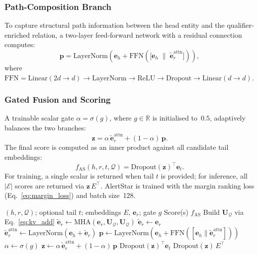 \documentclass[10pt,journal,compsoc]{IEEEtran}
\begin{document}
\subsubsection{Path-Composition Branch}
To capture structural path information between the head
entity and the qualifier-enriched relation, a two-layer
feed-forward network with a residual connection computes:
\begin{equation}
  \mathbf{p}
  = \mathrm{LayerNorm}\!\left(
      \mathbf{e}_h
      + \mathrm{FFN}\!\left(
          \bigl[\mathbf{e}_h
          \;\|\;
          \tilde{\mathbf{e}}_r^{\mathrm{attn}}\bigr]
        \right)
    \right),
  \label{eq:as_path}
\end{equation}
where
$\mathrm{FFN} = \mathrm{Linear}(2d{\to}d)
 \to \mathrm{LayerNorm}
 \to \mathrm{ReLU}
 \to \mathrm{Dropout}
 \to \mathrm{Linear}(d{\to}d)$.

\subsubsection{Gated Fusion and Scoring}
A trainable scalar gate $\alpha = \sigma(g)$,
where $g \in \mathbb{R}$ is initialised to~$0.5$,
adaptively balances the two branches:
\begin{equation}
  \mathbf{z}
  = \alpha\,\tilde{\mathbf{e}}_r^{\mathrm{attn}}
    + (1{-}\alpha)\,\mathbf{p}.
  \label{eq:as_gate}
\end{equation}
The final score is computed as an inner product against all
candidate tail embeddings:
\begin{equation}
  f_{\mathrm{AS}}(h,r,t,\mathcal{Q})
  = \mathrm{Dropout}(\mathbf{z})^{\top} \mathbf{e}_t.
  \label{eq:as_score}
\end{equation}
For training, a single scalar is returned when tail $t$ is
provided; for inference, all $|\mathcal{E}|$ scores are
returned via $\mathbf{z}\,E^{\top}$.
AlertStar is trained with the margin ranking loss
(Eq.~\ref{eq:margin_loss}) and batch size~128.

\begin{algorithm}[t]
\caption{AlertStar Forward Pass}
\label{alg:alertstar}
\begin{algorithmic}[1]
\Require $(h, r, \mathcal{Q})$; optional tail $t$;
  embeddings $E$, $\mathbf{e}_r$; gate $g$
\Ensure Score(s) $f_{\mathrm{AS}}$
  \State Build $\mathbf{U}_{\mathcal{Q}}$ via Eq.~\eqref{eq:kv_add}
  \State $\tilde{\mathbf{e}}_r \leftarrow
    \mathrm{MHA}(\mathbf{e}_r, \mathbf{U}_{\mathcal{Q}},
    \mathbf{U}_{\mathcal{Q}})$
\Else
  \State $\tilde{\mathbf{e}}_r \leftarrow \mathbf{e}_r$
\EndIf
\State $\tilde{\mathbf{e}}_r^{\mathrm{attn}} \leftarrow
  \mathrm{LayerNorm}(\mathbf{e}_h + \tilde{\mathbf{e}}_r)$
\State $\mathbf{p} \leftarrow
  \mathrm{LayerNorm}(\mathbf{e}_h +
  \mathrm{FFN}([\mathbf{e}_h \|
  \tilde{\mathbf{e}}_r^{\mathrm{attn}}]))$
\State $\alpha \leftarrow \sigma(g)$
\State $\mathbf{z} \leftarrow
  \alpha\,\tilde{\mathbf{e}}_r^{\mathrm{attn}}
  + (1{-}\alpha)\,\mathbf{p}$
  \State \Return $\mathrm{Dropout}(\mathbf{z})^{\top} \mathbf{e}_t$
\Else
  \State \Return $\mathrm{Dropout}(\mathbf{z})\,E^{\top}$
\EndIf
\end{algorithmic}
\end{algorithm}
\end{document}
